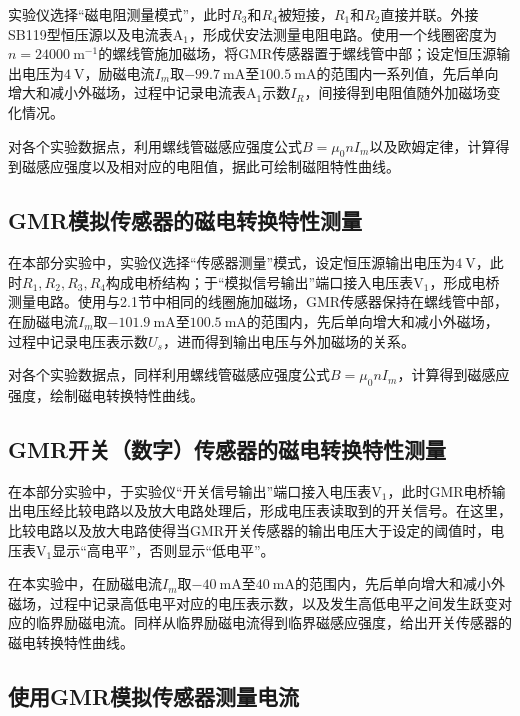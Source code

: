 \documentclass{thuemp}
\begin{document}
实验仪选择“磁电阻测量模式”，此时$R_3$和$R_4$被短接，$R_1$和$R_2$直接并联。外接SB119型恒压源以及电流表$\mathrm{A_1}$，形成伏安法测量电阻电路。使用一个线圈密度为$n=24000~ \mathrm{m^{-1}}$的螺线管施加磁场，将GMR传感器置于螺线管中部；设定恒压源输出电压为$4~\mathrm{V}$，励磁电流$I_m$取$-99.7 ~ \mathrm{mA}$至$100.5 ~ \mathrm{mA}$的范围内一系列值，先后单向增大和减小外磁场，过程中记录电流表$\mathrm{A_1}$示数$I_R$，间接得到电阻值随外加磁场变化情况。


对各个实验数据点，利用螺线管磁感应强度公式$B=\mu_0 n I_m$以及欧姆定律，计算得到磁感应强度以及相对应的电阻值，据此可绘制磁阻特性曲线。

\subsection{GMR模拟传感器的磁电转换特性测量}

在本部分实验中，实验仪选择“传感器测量”模式，设定恒压源输出电压为$4~\mathrm{V}$，此时$R_1, R_2, R_3, R_4$构成电桥结构；于“模拟信号输出”端口接入电压表$\mathrm{V_1}$，形成电桥测量电路。使用与2.1节中相同的线圈施加磁场，GMR传感器保持在螺线管中部，在励磁电流$I_m$取$-101.9 ~ \mathrm{mA}$至$100.5 ~ \mathrm{mA}$的范围内，先后单向增大和减小外磁场，过程中记录电压表示数$U_s$，进而得到输出电压与外加磁场的关系。

对各个实验数据点，同样利用螺线管磁感应强度公式$B=\mu_0 n I_m$，计算得到磁感应强度，绘制磁电转换特性曲线。

\subsection{GMR开关（数字）传感器的磁电转换特性测量}

在本部分实验中，于实验仪“开关信号输出”端口接入电压表$\mathrm{V_1}$，此时GMR电桥输出电压经比较电路以及放大电路处理后，形成电压表读取到的开关信号。在这里，比较电路以及放大电路使得当GMR开关传感器的输出电压大于设定的阈值时，电压表$\mathrm{V_1}$显示“高电平”，否则显示“低电平”。

在本实验中，在励磁电流$I_m$取$-40 ~ \mathrm{mA}$至$40 ~ \mathrm{mA}$的范围内，先后单向增大和减小外磁场，过程中记录高低电平对应的电压表示数，以及发生高低电平之间发生跃变对应的临界励磁电流。同样从临界励磁电流得到临界磁感应强度，给出开关传感器的磁电转换特性曲线。

\subsection{使用GMR模拟传感器测量电流}
\end{document}
